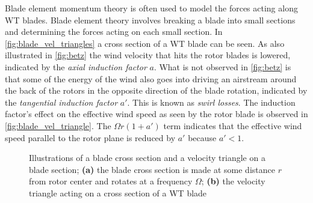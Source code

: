 Blade element momentum theory is often used to model the forces acting along WT blades. Blade element theory involves breaking a blade into small sections and determining the forces acting on each small section. In \cref{fig:blade_vel_triangles} a cross section of a WT blade can be seen. As also illustrated in \cref{fig:betz} the wind velocity that hits the rotor blades is lowered, indicated by the \textit{axial induction factor} $ a $. What is not observed in \cref{fig:betz} is that some of the energy of the wind also goes into driving an airstream around the back of the rotors in the opposite direction of the blade rotation, indicated by the \textit{tangential induction factor} $ a' $. This is known as \textit{swirl losses}. The induction factor's effect on the effective wind speed as seen by the rotor blade is observed in \cref{fig:blade_vel_triangle}. The $ \Omega r (1+a') $ term indicates that the effective wind speed parallel to the rotor plane is reduced by $ a' $ because $ a' < 1 $.
\begin{figure}[ht]
	\centering
	\hfil
	\caption{Illustrations of a blade cross section and a velocity triangle on a blade section; \textbf{(a)} the blade cross section is made at some distance $ r $ from rotor center and rotates at a frequency $ \Omega $; \textbf{(b)} the velocity triangle acting on a cross section of a WT blade}
	\label{fig:blade_triangles}
\end{figure}
